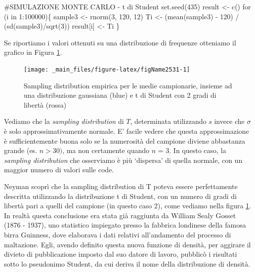 \documentclass[a4paper,12pt,oneside]{book}
\newenvironment{Shaded}{\begin{snugshade}}{\end{snugshade}}
\newcommand{\DecValTok}[1]{#1}
\newcommand{\SpecialCharTok}[1]{#1}
\newcommand{\CommentTok}[1]{#1}
\newcommand{\OtherTok}[1]{#1}
\newcommand{\FunctionTok}[1]{#1}
\newcommand{\ControlFlowTok}[1]{#1}
\newcommand{\NormalTok}[1]{#1}
\begin{document}
\begin{Shaded}
\begin{Highlighting}[]
\CommentTok{\#SIMULAZIONE MONTE CARLO {-} t di Student}
\FunctionTok{set.seed}\NormalTok{(}\DecValTok{435}\NormalTok{)}
\NormalTok{result }\OtherTok{\textless{}{-}} \FunctionTok{c}\NormalTok{()}
\ControlFlowTok{for}\NormalTok{ (i }\ControlFlowTok{in} \DecValTok{1}\SpecialCharTok{:}\DecValTok{100000}\NormalTok{)\{}
\NormalTok{  sample3 }\OtherTok{\textless{}{-}} \FunctionTok{rnorm}\NormalTok{(}\DecValTok{3}\NormalTok{, }\DecValTok{120}\NormalTok{, }\DecValTok{12}\NormalTok{)}
\NormalTok{  Ti }\OtherTok{\textless{}{-}}\NormalTok{ (}\FunctionTok{mean}\NormalTok{(sample3) }\SpecialCharTok{{-}} \DecValTok{120}\NormalTok{) }\SpecialCharTok{/}\NormalTok{ (}\FunctionTok{sd}\NormalTok{(sample3)}\SpecialCharTok{/}\FunctionTok{sqrt}\NormalTok{(}\DecValTok{3}\NormalTok{))}
\NormalTok{  result[i] }\OtherTok{\textless{}{-}}\NormalTok{ Ti}
\NormalTok{  \}}
\end{Highlighting}
\end{Shaded}

Se riportiamo i valori ottenuti su una distribuzione di frequenze otteniamo il grafico in Figura \ref{fig:figName2531}.

\begin{figure}

{\centering \texttt{[image: \_main\_files/figure-latex/figName2531-1]} 

}

\caption{Sampling distribution empirica per le medie campionarie, insieme ad una distribuzione gaussiana (blue) e t di Student con 2 gradi di libertà (rossa)}\label{fig:figName2531}
\end{figure}

Vediamo che la \emph{sampling distribution} di \(T\), determinata utilizzando \(s\) invece che \(\sigma\) è solo approssimativamente normale. E' facile vedere che questa approssimazione è sufficientemente buona solo se la numerosità del campione diviene abbastanza grande (es. \(n > 30)\), ma non certamente quando \(n\) = 3. In questo caso, la \emph{sampling distribution} che osserviamo è più `dispersa' di quella normale, con un maggior numero di valori sulle code.

Neyman scoprì che la sampling distribution di T poteva essere perfettamente descritta utilizzando la distribuzione t di Student, con un numero di gradi di libertà pari a quelli del campione (in questo caso 2), come vediamo nella figura \ref{fig:figName2531}. In realtà questa conclusione era stata già raggiunta da William Sealy Gosset (1876 - 1937), uno statistico impiegato presso la fabbrica londinese della famosa birra Guinness, dove elaborava i dati relativi all'andamento del processo di maltazione. Egli, avendo definito questa nuova funzione di densità, per aggirare il divieto di pubblicazione imposto dal suo datore di lavoro, pubblicò i risultati sotto lo pseudonimo Student, da cui deriva il nome della distribuzione di densità.
\end{document}
